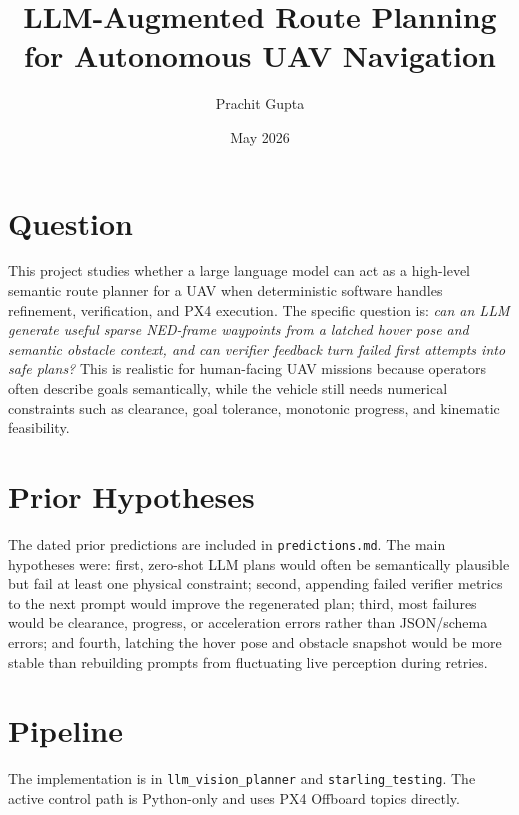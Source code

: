 \documentclass[12pt]{article}
\title{\vspace{-1.5em}\textbf{LLM-Augmented Route Planning for Autonomous UAV Navigation}}
\author{Prachit Gupta}
\date{May 2026}
\begin{document}
\maketitle
\vspace{-1.5em}

\section{Question}

This project studies whether a large language model can act as a high-level semantic route planner for a UAV when deterministic software handles refinement, verification, and PX4 execution. The specific question is: \emph{can an LLM generate useful sparse NED-frame waypoints from a latched hover pose and semantic obstacle context, and can verifier feedback turn failed first attempts into safe plans?} This is realistic for human-facing UAV missions because operators often describe goals semantically, while the vehicle still needs numerical constraints such as clearance, goal tolerance, monotonic progress, and kinematic feasibility.

\section{Prior Hypotheses}

The dated prior predictions are included in \texttt{predictions.md}. The main hypotheses were: first, zero-shot LLM plans would often be semantically plausible but fail at least one physical constraint; second, appending failed verifier metrics to the next prompt would improve the regenerated plan; third, most failures would be clearance, progress, or acceleration errors rather than JSON/schema errors; and fourth, latching the hover pose and obstacle snapshot would be more stable than rebuilding prompts from fluctuating live perception during retries.

\section{Pipeline}

The implementation is in \texttt{llm\_vision\_planner} and \texttt{starling\_testing}. The active control path is Python-only and uses PX4 Offboard topics directly.
\end{document}

